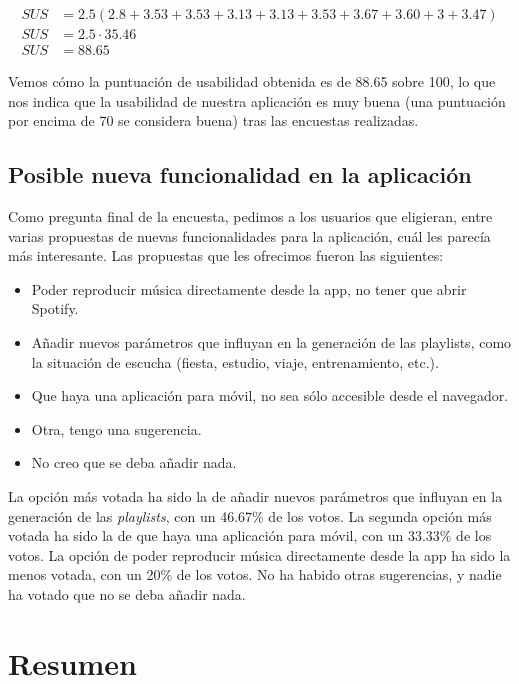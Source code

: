     \begin{align*}
        SUS &= 2.5 (2.8 + 3.53 + 3.53 + 3.13 + 3.13 + 3.53 + 3.67 + 3.60 + 3 + 3.47) \\
        SUS &= 2.5 \cdot 35.46 \\
        SUS &= 88.65
    \end{align*}

Vemos cómo la puntuación de usabilidad obtenida es de 88.65 sobre 100, lo que nos indica que la usabilidad de nuestra aplicación
es muy buena (una puntuación por encima de 70 se considera buena) tras las encuestas realizadas.

\subsection{Posible nueva funcionalidad en la aplicación\label{SEC:GESTION_USUARIOS}}

Como pregunta final de la encuesta, pedimos a los usuarios que eligieran, entre varias propuestas de nuevas funcionalidades para la 
aplicación, cuál les parecía más interesante. Las propuestas que les ofrecimos fueron las siguientes:

\begin{itemize}
    \item Poder reproducir música directamente desde la app, no tener que abrir Spotify.
    \item Añadir nuevos parámetros que influyan en la generación de las playlists, como la situación de escucha (fiesta, estudio, viaje, entrenamiento, etc.).
    \item Que haya una aplicación para móvil, no sea sólo accesible desde el navegador.
    \item Otra, tengo una sugerencia.
    \item No creo que se deba añadir nada.
\end{itemize}

La opción más votada ha sido la de añadir nuevos parámetros que influyan en la generación de las \textit{playlists}, con un 46.67\% de los votos.
La segunda opción más votada ha sido la de que haya una aplicación para móvil, con un 33.33\% de los votos. 
La opción de poder reproducir música directamente desde la app ha sido la menos votada, con un 20\% de los votos.
No ha habido otras sugerencias, y nadie ha votado que no se deba añadir nada.

\section{Resumen\label{SEC:RESUMEN_ENCUESTA}}

